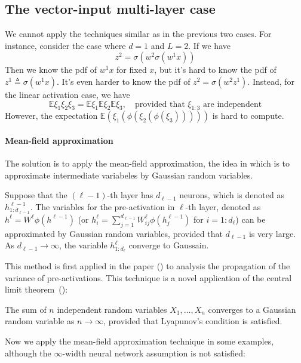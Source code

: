 \subsection{The vector-input multi-layer case}
We cannot apply the techniques similar as in the previous two cases.
For instance, consider the case where $d=1$ and $L=2$. If we have 
\[
z^2 = \sigma(w^2\sigma(w^1x))
\]
Then we know the pdf of $w^1x$ for fixed $x$, but it's hard to know the pdf of 
$z^1\triangleq\sigma(w^1x)$. It's even harder to know the pdf of $z^2 = \sigma(w^2z^1)$.
Instead, for the linear activation case, we have 
\[
\mathbb{E}\xi_1\xi_2\xi_3=\mathbb{E}\xi_1\mathbb{E}\xi_2\mathbb{E}\xi_3,\quad\text{provided that $\xi_{1:3}$ are independent}
\]
However, the expectation $\mathbb{E}(\xi_1(\phi(\xi_2(\phi(\xi_3)))))$ is hard to compute.

\paragraph{Mean-field approximation}
The solution is to apply the mean-field approximation, the idea in which is to approximate intermediate variabeles by Gaussian random variables.
\begin{proposition}
Suppose that the $(\ell-1)$-th layer has $d_{\ell-1}$ neurons, which is denoted as $h^{\ell-1}_{1:d_{\ell-1}}$.
The variables for the pre-activation in $\ell$-th layer, denoted as $h^{\ell}=W^{\ell} \phi(h^{\ell-1})$ (or $h_i^{\ell} = \sum_{j=1}^{d_{\ell-1}}W_{ij}^{\ell}\phi(h^{\ell-1}_j)$ for $i=1:d_{\ell}$) can be approximated by Gaussian random variables, provided that $d_{\ell-1}$ is very large.
As $d_{\ell-1}\to\infty$, the variable $h^{\ell}_{1:d_{\ell}}$ converge to Gaussain.
\end{proposition}
This method is first applied in the paper (\cite{NIPS2016_6322}) to analysis the propagation of the variance of pre-activations. 
This technique is a novel application of the central limit theorem~(\cite{Bill86}):
\begin{theorem}
The sum of $n$ independent random variables $X_1,\ldots,X_n$ converges to a Gaussian random variable as $n\to\infty$, provided that Lyapunov’s condition is satisfied.
\end{theorem}
Now we apply the mean-field approximation technique in some examples, although the $\infty$-width neural network assumption is not satisfied:
